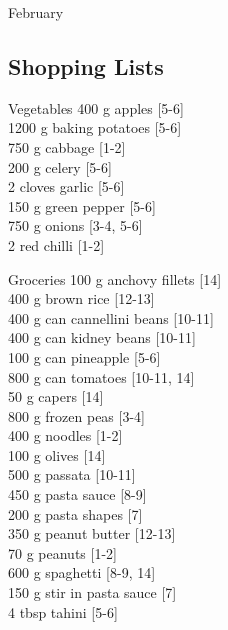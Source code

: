 \begin{menu}{February}
    \subsection*{Shopping Lists}
      \begin{shoppinglist}{Vegetables}
      400 g apples {\scriptsize[5-6]}\\
      1200 g baking potatoes {\scriptsize[5-6]}\\
      750 g cabbage {\scriptsize[1-2]}\\
      200 g celery {\scriptsize[5-6]}\\
      2 cloves garlic {\scriptsize[5-6]}\\
      150 g green pepper {\scriptsize[5-6]}\\
      750 g onions {\scriptsize[3-4, 5-6]}\\
      2  red chilli {\scriptsize[1-2]}\\
      \end{shoppinglist}%
      \begin{shoppinglist}{Groceries}
      100 g anchovy fillets {\scriptsize[14]}\\
      400 g brown rice {\scriptsize[12-13]}\\
      400 g can cannellini beans {\scriptsize[10-11]}\\
      400 g can kidney beans {\scriptsize[10-11]}\\
      100 g can pineapple {\scriptsize[5-6]}\\
      800 g can tomatoes {\scriptsize[10-11, 14]}\\
      50 g capers {\scriptsize[14]}\\
      800 g frozen peas {\scriptsize[3-4]}\\
      400 g noodles {\scriptsize[1-2]}\\
      100 g olives {\scriptsize[14]}\\
      500 g passata {\scriptsize[10-11]}\\
      450 g pasta sauce {\scriptsize[8-9]}\\
      200 g pasta shapes {\scriptsize[7]}\\
      350 g peanut butter {\scriptsize[12-13]}\\
      70 g peanuts {\scriptsize[1-2]}\\
      600 g spaghetti {\scriptsize[8-9, 14]}\\
      150 g stir in pasta sauce {\scriptsize[7]}\\
      4 tbsp tahini {\scriptsize[5-6]}\\

\end{shoppinglist}
\end{menu}
